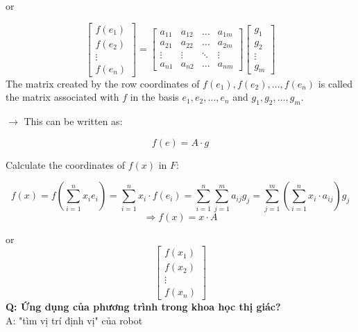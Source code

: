 or

\begin{equation*}
    \begin{bmatrix}
        f(e_1)\\
        f(e_2)\\
        \vdots\\
        f(e_n)
    \end{bmatrix}
    =
    \begin{bmatrix}
        a_{11} & a_{12} & \ldots & a_{1m}\\
        a_{21} & a_{22} & \ldots & a_{2m}\\
        \vdots & \vdots & \ddots & \vdots\\
        a_{n1} & a_{n2} & \ldots & a_{nm}
    \end{bmatrix}
    \begin{bmatrix}
        g_1\\
        g_2\\
        \vdots\\
        g_m
    \end{bmatrix}
\end{equation*} 
The matrix created by the row coordinates of $f(e_1), f(e_2), \ldots, f(e_n)$ is called the matrix associated with $f$ in the basis $e_1, e_2, \ldots, e_n$ and $g_1, g_2, \ldots, g_m$.

$\rightarrow$ This can be written as:

\[
f(e) = A \cdot g
\]

Calculate the coordinates of $f(x)$ in $F$:

\begin{equation*}
    f(x) = f\left(\sum_{i=1}^n x_i e_i\right) = \sum_{i=1}^n x_i \cdot f(e_i) = \sum_{i=1}^n \sum_{j=1}^m a_{ij} g_j = \sum_{j=1}^m \left(\sum_{i=1}^n x_i \cdot a_{ij}\right) g_j
\end{equation*}
\[
    \Rightarrow f(x) = x \cdot A
\]

or
\begin{equation*}
    \begin{bmatrix}
        f(x_1)\\
        f(x_2)\\
        \vdots\\
        f(x_n)
    \end{bmatrix}
\end{equation*}
\textbf{Q: Ứng dụng của phương trình trong khoa học thị giác?}\\
A: "tìm vị trí định vị" của robot

